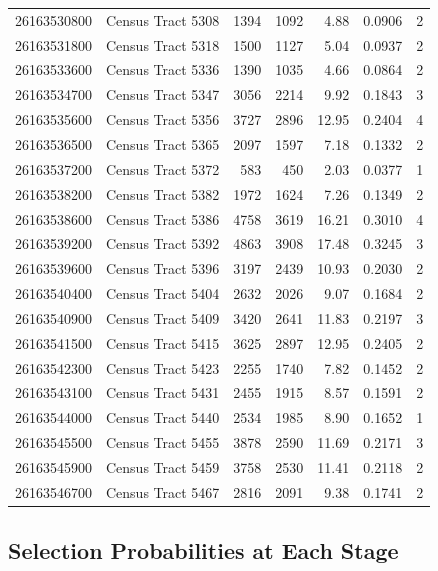 \documentclass[
  11pt,
  letterpaper,
  DIV=11,
  numbers=noendperiod]{scrartcl}
\begin{document}
\begin{table}[!h]
{\begin{tabular}[t]{llrrrrr}
26163530800 & Census Tract 5308 & 1394 & 1092 & 4.88 & 0.0906 & 2\\
26163531800 & Census Tract 5318 & 1500 & 1127 & 5.04 & 0.0937 & 2\\
26163533600 & Census Tract 5336 & 1390 & 1035 & 4.66 & 0.0864 & 2\\
26163534700 & Census Tract 5347 & 3056 & 2214 & 9.92 & 0.1843 & 3\\
26163535600 & Census Tract 5356 & 3727 & 2896 & 12.95 & 0.2404 & 4\\
26163536500 & Census Tract 5365 & 2097 & 1597 & 7.18 & 0.1332 & 2\\
26163537200 & Census Tract 5372 & 583 & 450 & 2.03 & 0.0377 & 1\\
26163538200 & Census Tract 5382 & 1972 & 1624 & 7.26 & 0.1349 & 2\\
26163538600 & Census Tract 5386 & 4758 & 3619 & 16.21 & 0.3010 & 4\\
26163539200 & Census Tract 5392 & 4863 & 3908 & 17.48 & 0.3245 & 3\\
26163539600 & Census Tract 5396 & 3197 & 2439 & 10.93 & 0.2030 & 2\\
26163540400 & Census Tract 5404 & 2632 & 2026 & 9.07 & 0.1684 & 2\\
26163540900 & Census Tract 5409 & 3420 & 2641 & 11.83 & 0.2197 & 3\\
26163541500 & Census Tract 5415 & 3625 & 2897 & 12.95 & 0.2405 & 2\\
26163542300 & Census Tract 5423 & 2255 & 1740 & 7.82 & 0.1452 & 2\\
26163543100 & Census Tract 5431 & 2455 & 1915 & 8.57 & 0.1591 & 2\\
26163544000 & Census Tract 5440 & 2534 & 1985 & 8.90 & 0.1652 & 1\\
26163545500 & Census Tract 5455 & 3878 & 2590 & 11.69 & 0.2171 & 3\\
26163545900 & Census Tract 5459 & 3758 & 2530 & 11.41 & 0.2118 & 2\\
26163546700 & Census Tract 5467 & 2816 & 2091 & 9.38 & 0.1741 & 2\\
\bottomrule
\end{tabular}}
\end{table}

\subsection{Selection Probabilities at Each
Stage}\label{selection-probabilities-at-each-stage}
\end{document}
